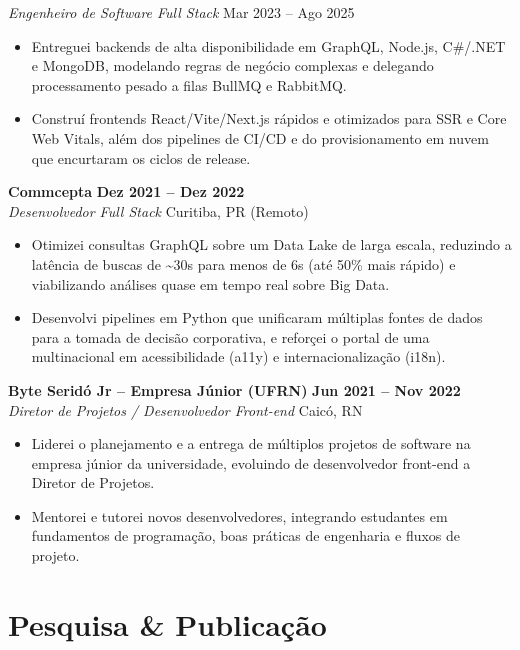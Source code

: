 \documentclass[11pt,a4paper]{article}
\newcommand{\subrole}[2]{%
  \needspace{4\baselineskip}%
  \textit{#1} \hfill \textcolor{muted}{#2}\\[3pt]
}
\newcommand{\role}[4]{%
  \needspace{5\baselineskip}%
  \textbf{#1} \hfill \textbf{#3} \\[2pt]
  \textit{#2} \hfill \textcolor{muted}{#4}\\[4pt]
}
\begin{document}
\subrole{Engenheiro de Software Full Stack}{Mar 2023 -- Ago 2025}
\begin{itemize}[leftmargin=14pt, itemsep=2pt, topsep=0pt]
    \item Entreguei backends de alta disponibilidade em GraphQL, Node.js, C\#/.NET e MongoDB, modelando regras de neg\'ocio complexas e delegando processamento pesado a filas BullMQ e RabbitMQ.
    \item Constru\'i frontends React/Vite/Next.js r\'apidos e otimizados para SSR e Core Web Vitals, al\'em dos pipelines de CI/CD e do provisionamento em nuvem que encurtaram os ciclos de release.
\end{itemize}
\vspace{3pt}

\role{Commcepta}{Desenvolvedor Full Stack}{Dez 2021 -- Dez 2022}{Curitiba, PR (Remoto)}
\begin{itemize}[leftmargin=14pt, itemsep=2pt, topsep=0pt]
    \item Otimizei consultas GraphQL sobre um Data Lake de larga escala, reduzindo a lat\^encia de buscas de \textasciitilde30s para menos de 6s (at\'e 50\% mais r\'apido) e viabilizando an\'alises quase em tempo real sobre Big Data.
    \item Desenvolvi pipelines em Python que unificaram m\'ultiplas fontes de dados para a tomada de decis\~ao corporativa, e refor\c{c}ei o portal de uma multinacional em acessibilidade (a11y) e internacionaliza\c{c}\~ao (i18n).
\end{itemize}
\vspace{3pt}

\role{Byte Serid\'o Jr -- Empresa J\'unior (UFRN)}{Diretor de Projetos / Desenvolvedor Front-end}{Jun 2021 -- Nov 2022}{Caic\'o, RN}
\begin{itemize}[leftmargin=14pt, itemsep=2pt, topsep=0pt]
    \item Liderei o planejamento e a entrega de m\'ultiplos projetos de software na empresa j\'unior da universidade, evoluindo de desenvolvedor front-end a Diretor de Projetos.
    \item Mentorei e tutorei novos desenvolvedores, integrando estudantes em fundamentos de programa\c{c}\~ao, boas pr\'aticas de engenharia e fluxos de projeto.
\end{itemize}

\section{Pesquisa \& Publica\c{c}\~ao}
\end{document}

